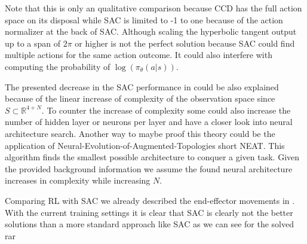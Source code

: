Note that this is only an qualitative comparison because CCD has the full action space on its disposal while SAC is limited to -1 to one because of the action normalizer at the back of SAC. Although scaling the hyperbolic tangent output up to a span of $2\pi$ or higher is not the perfect solution because SAC could find multiple actions for the same action outcome. It could also interfere with computing the probability of $\log(\pi_\theta(a|s))$.

The presented decrease in the SAC performance in  could be also explained because of the linear increase of complexity of the observation space since $S \subset \mathbb{R}^{4+N}$. To counter the increase of complexity some could also increase the number of hidden layer or neurons per layer and have a closer look into neural architecture search. Another way to maybe proof this theory could be the application of Neural-Evolution-of-Augmented-Topologies short NEAT. This algorithm finds the smallest possible architecture to conquer a given task. Given the provided background information we assume the found neural architecture increases in complexity while increasing $N$.

Comparing RL with SAC we already described the end-effector movements in . With the current training settings it is clear that SAC is clearly not the better solutions than a more standard approach like SAC as we can see for the solved rar


